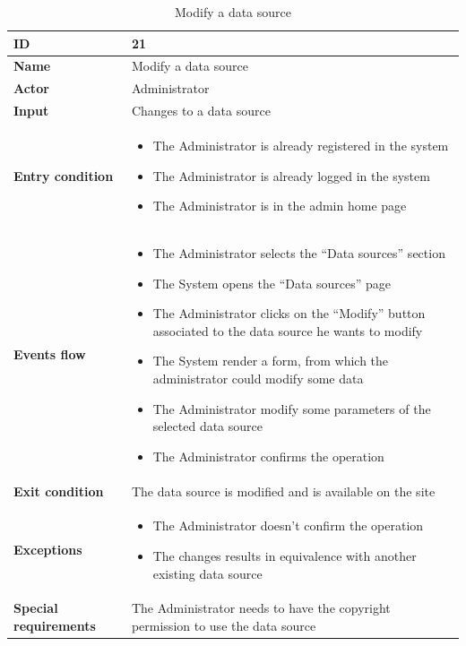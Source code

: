    \begin{longtable}{p{} | p{}}
     \caption{Modify a data source}
        \label{tab:modify_data_source}\\
        \hline
        \textbf{ID} & 21\\
        \hline
        \textbf{Name}  &  Modify a data source\\
        \hline
        \textbf{Actor}  &  Administrator\\
        \hline
        \textbf{Input}  &  Changes to a data source\\
        \hline
        \textbf{Entry condition}  &  
        \begin{itemize}
                \item The Administrator is already registered in the system
                \item The Administrator is already logged in the system
                \item The Administrator is in the admin home page
         \end{itemize}\\
        \hline
        \textbf{Events flow} & 
        \begin{itemize}
                \item The Administrator selects the “Data sources” section
                \item The System opens the “Data sources” page
                \item The Administrator clicks on the “Modify” button associated to the data source he wants to modify
                \item The System render a form, from which the administrator could modify some data 
                \item The Administrator modify some parameters of the selected data source
                \item The Administrator confirms the operation 
                 \end{itemize}
                 \\
        \hline
        \textbf{Exit condition} & The data source is modified and is available on the site\\
        \hline
        \textbf{Exceptions} &  
        \begin{itemize}
            \item The Administrator doesn’t confirm the operation
            \item The changes results in equivalence with another existing data source
        \end{itemize}\\
        \hline
        \textbf{Special requirements} &  The Administrator needs to have the copyright permission to use the data source\\
        \hline
       
        
    \end{longtable}

